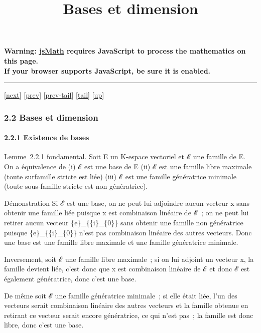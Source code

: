 \documentclass[]{article}
\title{Bases et dimension}
\author{}
\date{}
\begin{document}
\maketitle

\textbf{Warning: \href{http://www.math.union.edu/locate/jsMath}{jsMath}
requires JavaScript to process the mathematics on this page.\\ If your
browser supports JavaScript, be sure it is enabled.}

\begin{center}\rule{3in}{0.4pt}\end{center}

{[}\href{coursse9.html}{next}{]} {[}\href{coursse7.html}{prev}{]}
{[}\href{coursse7.html\#tailcoursse7.html}{prev-tail}{]}
{[}\hyperref[tailcoursse8.html]{tail}{]}
{[}\href{coursch3.html\#coursse8.html}{up}{]}

\subsubsection{2.2 Bases et dimension}

\paragraph{2.2.1 Existence de bases}

Lemme~2.2.1 fondamental. Soit E un K-espace vectoriel et ℰ une famille
de E. On a équivalence de (i) ℰ est une base de E (ii) ℰ est une famille
libre maximale (toute surfamille stricte est liée) (iii) ℰ est une
famille génératrice minimale (toute sous-famille stricte est non
génératrice).

Démonstration Si ℰ est une base, on ne peut lui adjoindre aucun vecteur
x sans obtenir une famille liée puisque x est combinaison linéaire de
ℰ~; on ne peut lui retirer aucun vecteur \{e\}\_\{\{i\}\_\{0\}\} sans
obtenir une famille non génératrice puisque \{e\}\_\{\{i\}\_\{0\}\}
n'est pas combinaison linéaire des autres vecteurs. Donc une base est
une famille libre maximale et une famille génératrice minimale.

Inversement, soit ℰ une famille libre maximale~; si on lui adjoint un
vecteur x, la famille devient liée, c'est donc que x est combinaison
linéaire de ℰ et donc ℰ est également génératrice, donc c'est une base.

De même soit ℰ une famille génératrice minimale~; si elle était liée,
l'un des vecteurs serait combinaison linéaire des autres vecteurs et la
famille obtenue en retirant ce vecteur serait encore génératrice, ce qui
n'est pas~; la famille est donc libre, donc c'est une base.
\end{document}
